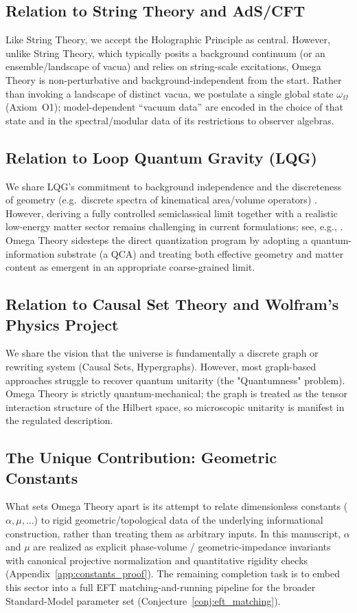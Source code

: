 \subsection{Relation to String Theory and AdS/CFT}
Like String Theory, we accept the Holographic Principle as central. However, unlike String Theory, which typically posits a background continuum (or an ensemble/landscape of vacua) and relies on string-scale excitations, Omega Theory is non-perturbative and background-independent from the start. Rather than invoking a landscape of distinct vacua, we postulate a single global state $\omega_\Omega$ (Axiom~O1); model-dependent ``vacuum data'' are encoded in the choice of that state and in the spectral/modular data of its restrictions to observer algebras.

\subsection{Relation to Loop Quantum Gravity (LQG)}
We share LQG's commitment to background independence and the discreteness of geometry (e.g.\ discrete spectra of kinematical area/volume operators) \cite{RovelliSmolin1995,AshtekarLewandowski1997Area}. However, deriving a fully controlled semiclassical limit together with a realistic low-energy matter sector remains challenging in current formulations; see, e.g., \cite{Perez2013SpinFoam,Thiemann2007}. Omega Theory sidesteps the direct quantization program by adopting a quantum-information substrate (a QCA) and treating both effective geometry and matter content as emergent in an appropriate coarse-grained limit.

\subsection{Relation to Causal Set Theory and Wolfram's Physics Project}
We share the vision that the universe is fundamentally a discrete graph or rewriting system (Causal Sets, Hypergraphs). However, most graph-based approaches struggle to recover quantum unitarity (the "Quantumness" problem). Omega Theory is strictly quantum-mechanical; the graph is treated as the tensor interaction structure of the Hilbert space, so microscopic unitarity is manifest in the regulated description.

\subsection{The Unique Contribution: Geometric Constants}
What sets Omega Theory apart is its attempt to relate dimensionless constants ($\alpha, \mu, \dots$) to rigid geometric/topological data of the underlying informational construction, rather than treating them as arbitrary inputs. In this manuscript, $\alpha$ and $\mu$ are realized as explicit phase-volume / geometric-impedance invariants with canonical projective normalization and quantitative rigidity checks (Appendix~\ref{app:constants_proof}). The remaining completion task is to embed this sector into a full EFT matching-and-running pipeline for the broader Standard-Model parameter set (Conjecture~\ref{conj:eft_matching}).

